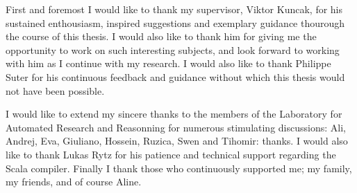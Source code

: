 First and foremost I would like to thank my supervisor, Viktor Kuncak, for his
sustained enthousiasm, inspired suggestions and exemplary guidance thourough
the course of this thesis. I would also like to thank him for giving me the
opportunity to work on such interesting subjects, and look forward to working
with him as I continue with my research. I would also like to thank Philippe
Suter for his continuous feedback and guidance without which this thesis would
not have been possible.

I would like to extend my sincere thanks to the members of the Laboratory for
Automated Research and Reasonning for numerous stimulating discussions: Ali,
Andrej, Eva, Giuliano, Hossein, Ruzica, Swen and Tihomir: thanks. I would also
like to thank Lukas Rytz for his patience and technical support regarding the
Scala compiler. Finally I thank those who continuously supported me; my
family, my friends, and of course Aline.
